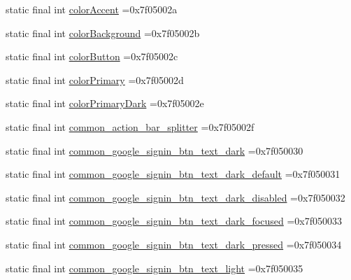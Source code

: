 \begin{DoxyCompactItemize}
static final int \mbox{\hyperlink{classbr_1_1unb_1_1cic_1_1mp_1_1marketmaster_1_1R_1_1color_abbc091b9b1a5ac3baab82b8c8ef14056}{color\+Accent}} =0x7f05002a
\item 
static final int \mbox{\hyperlink{classbr_1_1unb_1_1cic_1_1mp_1_1marketmaster_1_1R_1_1color_acff247673af0a8fb2964e68480037c96}{color\+Background}} =0x7f05002b
\item 
static final int \mbox{\hyperlink{classbr_1_1unb_1_1cic_1_1mp_1_1marketmaster_1_1R_1_1color_a7795b9f6d1e823101aab2362b2aec772}{color\+Button}} =0x7f05002c
\item 
static final int \mbox{\hyperlink{classbr_1_1unb_1_1cic_1_1mp_1_1marketmaster_1_1R_1_1color_af621ecd277bda213d8fef30dc7caac0e}{color\+Primary}} =0x7f05002d
\item 
static final int \mbox{\hyperlink{classbr_1_1unb_1_1cic_1_1mp_1_1marketmaster_1_1R_1_1color_a58b9ff5d5f63bbe7a0ecbff60fd184c4}{color\+Primary\+Dark}} =0x7f05002e
\item 
static final int \mbox{\hyperlink{classbr_1_1unb_1_1cic_1_1mp_1_1marketmaster_1_1R_1_1color_abd05c5ebd4e93249663d7761cf5768fc}{common\+\_\+action\+\_\+bar\+\_\+splitter}} =0x7f05002f
\item 
static final int \mbox{\hyperlink{classbr_1_1unb_1_1cic_1_1mp_1_1marketmaster_1_1R_1_1color_a8ba1f222d87fffe6dfeaaa80e79f5699}{common\+\_\+google\+\_\+signin\+\_\+btn\+\_\+text\+\_\+dark}} =0x7f050030
\item 
static final int \mbox{\hyperlink{classbr_1_1unb_1_1cic_1_1mp_1_1marketmaster_1_1R_1_1color_ac066e34f1737613c68a3828cbd882c4d}{common\+\_\+google\+\_\+signin\+\_\+btn\+\_\+text\+\_\+dark\+\_\+default}} =0x7f050031
\item 
static final int \mbox{\hyperlink{classbr_1_1unb_1_1cic_1_1mp_1_1marketmaster_1_1R_1_1color_a4dfcf278da64055190a433f22d104834}{common\+\_\+google\+\_\+signin\+\_\+btn\+\_\+text\+\_\+dark\+\_\+disabled}} =0x7f050032
\item 
static final int \mbox{\hyperlink{classbr_1_1unb_1_1cic_1_1mp_1_1marketmaster_1_1R_1_1color_a13d27c138d55f41844a7e9e41308a65e}{common\+\_\+google\+\_\+signin\+\_\+btn\+\_\+text\+\_\+dark\+\_\+focused}} =0x7f050033
\item 
static final int \mbox{\hyperlink{classbr_1_1unb_1_1cic_1_1mp_1_1marketmaster_1_1R_1_1color_a63e2acfe85ff0ca0923c4ed9208729f2}{common\+\_\+google\+\_\+signin\+\_\+btn\+\_\+text\+\_\+dark\+\_\+pressed}} =0x7f050034
\item 
static final int \mbox{\hyperlink{classbr_1_1unb_1_1cic_1_1mp_1_1marketmaster_1_1R_1_1color_a862cd39900cf46bfb2fb20f93311e258}{common\+\_\+google\+\_\+signin\+\_\+btn\+\_\+text\+\_\+light}} =0x7f050035

\end{DoxyCompactItemize}
